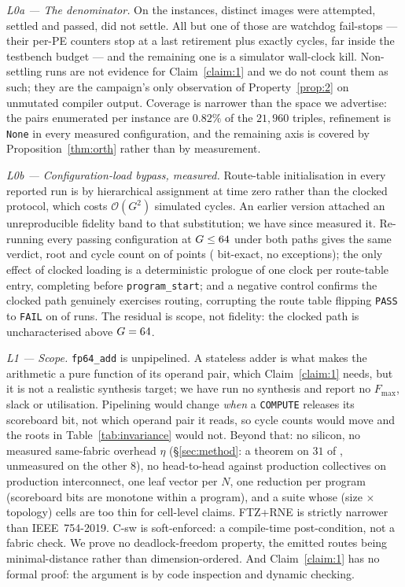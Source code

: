 \documentclass[journal,10pt]{IEEEtran}
\theoremstyle{plain}
\theoremstyle{definition}
\theoremstyle{remark}
\newcommand{\sv}[1]{\texttt{#1}}
\begin{document}
\emph{L0a --- The denominator.} On the \TournNInst{} instances,
\InvAttempted{} distinct images were attempted, \WallTBs{} settled and passed,
\InvNonSettling{} did not settle. All but one of those are watchdog
fail-stops --- their per-PE counters stop at a last retirement plus exactly
\WatchdogMax{} cycles, far inside the testbench budget --- and the remaining
one is a simulator wall-clock kill. Non-settling runs are not evidence for
Claim~\ref{claim:1} and we do not count them as such; they are the campaign's
only observation of Property~\ref{prop:2} on unmutated compiler output.
Coverage is narrower than the space we advertise: the \SelConfigsTotal{} pairs
enumerated per instance are $0.82\%$ of the $21{,}960$ triples, refinement is
\sv{None} in every measured configuration, and the remaining axis is covered
by Proposition~\ref{thm:orth} rather than by measurement.

\emph{L0b --- Configuration-load bypass, measured.} Route-table
initialisation in every reported run is by hierarchical assignment at time
zero rather than the clocked protocol, which costs $\mathcal{O}(G^2)$
simulated cycles. An earlier version attached an unreproducible fidelity band
to that substitution; we have since measured it. Re-running every passing
configuration at $G \le 64$ under both paths gives the same verdict,
root and cycle count on \RouteRuns{} of \RouteRuns{} points
(\RouteBitExact{} bit-exact, no exceptions); the only effect of clocked
loading is a deterministic prologue of one clock per route-table entry,
completing before \sv{program\_start}; and a negative control confirms the
clocked path genuinely exercises routing, corrupting the route table flipping
\sv{PASS} to \sv{FAIL} on \RouteNegCtrl{} of \RouteNegCtrl{} runs. The
residual is scope, not fidelity: the clocked path is uncharacterised above
$G = 64$.

\emph{L1 --- Scope.} \sv{fp64\_add} is unpipelined. A stateless adder is what
makes the arithmetic a pure function of its operand pair, which
Claim~\ref{claim:1} needs, but it is not a realistic synthesis target; we have
run no synthesis and report no $F_{\max}$, slack or utilisation. Pipelining
would change \emph{when} a \texttt{COMPUTE} releases its scoreboard bit, not
which operand pair it reads, so cycle counts would move and the roots in
Table~\ref{tab:invariance} would not. Beyond that: no silicon, no measured
same-fabric overhead $\eta$ (\S\ref{sec:method}: a theorem on $31$ of
\TournNInst{}, unmeasured on the other $8$), no head-to-head against
production collectives on production interconnect, one leaf vector per $N$,
one reduction per program (scoreboard bits are monotone within a program), and
a suite whose (size $\times$ topology) cells are too thin for cell-level
claims. FTZ+RNE is strictly narrower than IEEE~754-2019. \textsf{C-sw} is
soft-enforced: a compile-time post-condition, not a fabric check. We prove no
deadlock-freedom property, the emitted routes being minimal-distance rather
than dimension-ordered. And Claim~\ref{claim:1} has no formal proof: the
argument is by code inspection and dynamic checking.
\end{document}

